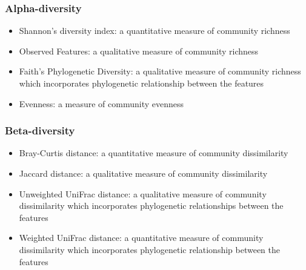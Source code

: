 \documentclass{beamer}
\begin{document}
    \begin{frame}
        \frametitle{Alpha-diversity}

        \begin{itemize}
            \item Shannon's diversity index: a quantitative measure of community richness
            \item Observed Features: a qualitative measure of community richness
            \item Faith's Phylogenetic Diversity: a qualitative measure of community richness which incorporates phylogenetic relationship between the features
            \item Evenness: a measure of community evenness
        \end{itemize}
        \cite{qiime1, qiime2}
    \end{frame}

    \begin{frame}
        \frametitle{Beta-diversity}

        \begin{itemize}
            \item Bray-Curtis distance: a quantitative measure of community dissimilarity
            \item Jaccard distance: a qualitative measure of community dissimilarity
            \item Unweighted UniFrac distance: a qualitative measure of community dissimilarity which incorporates phylogenetic relationships between the features
            \item Weighted UniFrac distance: a quantitative measure of community dissimilarity which incorporates phylogenetic relationship between the features
        \end{itemize}
        \cite{qiime1, qiime2}
    \end{frame}
\end{document}
